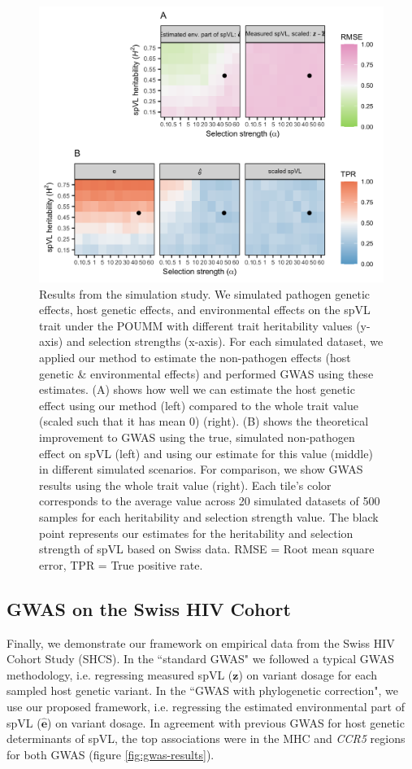 \documentclass[]{article}
\begin{document}
\begin{doublespace}
\begin{figure}[H]
	\begin{center}
		\includegraphics[width=0.75\linewidth]{figures/simulation_results}
		\caption{Results from the simulation study. We simulated pathogen genetic effects, host genetic effects, and environmental effects on the spVL trait under the POUMM with different trait heritability values (y-axis) and selection strengths (x-axis). For each simulated dataset, we applied our method to estimate the non-pathogen effects (host genetic \& environmental effects) and performed GWAS using these estimates. (A) shows how well we can estimate the host genetic effect using our method (left) compared to the whole trait value (scaled such that it has mean 0) (right). (B) shows the theoretical improvement to GWAS using the true, simulated non-pathogen effect on spVL (left) and using our estimate for this value (middle) in different simulated scenarios. For comparison, we show GWAS results using the whole trait value (right). Each tile's color corresponds to the average value across 20 simulated datasets of 500 samples for each heritability and selection strength value. The black point represents our estimates for the heritability and selection strength of spVL based on Swiss data. RMSE = Root mean square error, TPR = True positive rate.}
		\label{fig:simulationResults}
	\end{center}
\end{figure}

\subsection{GWAS on the Swiss HIV Cohort}

Finally, we demonstrate our framework on empirical data from the Swiss HIV Cohort Study (SHCS). In the ``standard GWAS" we followed a typical GWAS methodology,  i.e. regressing measured spVL ($\bm{z}$) on variant dosage for each sampled host genetic variant. In the ``GWAS with phylogenetic correction", we use our proposed framework, i.e. regressing the estimated environmental part of spVL ($\bm{\hat{e}}$) on variant dosage. In agreement with previous GWAS for host genetic determinants of spVL, the top associations were in the MHC and \emph{CCR5} regions for both GWAS (figure \ref{fig:gwas-results}). 


\end{doublespace}
\end{document}
